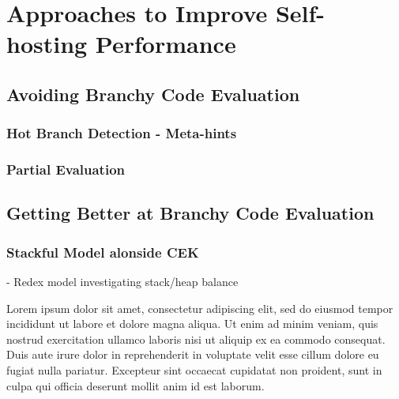 \chapter{Approaches to Improve Self-hosting Performance}
	\section{Avoiding Branchy Code Evaluation}
		\subsection{Hot Branch Detection - Meta-hints}
		\subsection{Partial Evaluation}
	\section{Getting Better at Branchy Code Evaluation}
		\subsection{Stackful Model alonside CEK}
		- Redex model investigating stack/heap balance

Lorem ipsum dolor sit amet, consectetur adipiscing elit, sed do eiusmod tempor incididunt ut labore et dolore magna aliqua. Ut enim ad minim veniam, quis nostrud exercitation ullamco laboris nisi ut aliquip ex ea commodo consequat. Duis aute irure dolor in reprehenderit in voluptate velit esse cillum dolore eu fugiat nulla pariatur. Excepteur sint occaecat cupidatat non proident, sunt in culpa qui officia deserunt mollit anim id est laborum.
